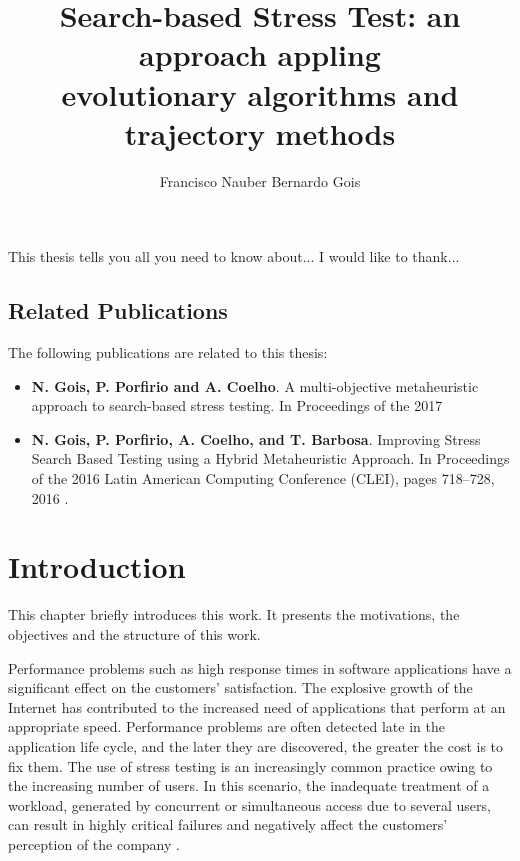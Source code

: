 \documentclass{report}
\begin{document}
\title{Search-based Stress Test: an approach appling \\ evolutionary algorithms and trajectory methods}
\author{Francisco Nauber Bernardo Gois}
 
\beforepreface
{}
This thesis tells you all you need to know about...
I would like to thank...
\afterpreface

\section*{Related Publications}


The following publications are related to this thesis:



\begin{itemize}
\item \textbf{N. Gois, P. Porfirio and A. Coelho}. A multi-objective metaheuristic approach to search-based stress testing. In Proceedings of the 2017 

\item \textbf{N. Gois, P. Porfirio, A. Coelho, and T. Barbosa}. Improving Stress Search Based Testing using a Hybrid Metaheuristic Approach. In Proceedings of the 2016 Latin American Computing Conference (CLEI), pages 718–728, 2016 \cite{Gois2016}.
\end{itemize}


\chapter{Introduction}

This chapter briefly introduces this work. It presents the motivations, the objectives and the structure of this work.

Performance problems such as high response times in software applications have a significant effect on the customers’ satisfaction. The explosive growth of the Internet has contributed to the increased need of  applications that perform at an appropriate speed. Performance problems are often detected late in the application life cycle, and the later they are discovered, the greater the cost is to fix them. The use of stress testing is an increasingly common practice owing to the increasing number of users. In this scenario, the inadequate treatment of a workload,  generated by concurrent or simultaneous access due to several users, can result in highly critical failures and negatively affect the customers' perception of the company  \cite{Jiang2010} \cite{Molyneaux2009} \cite{Wert2014}. 
\end{document}
